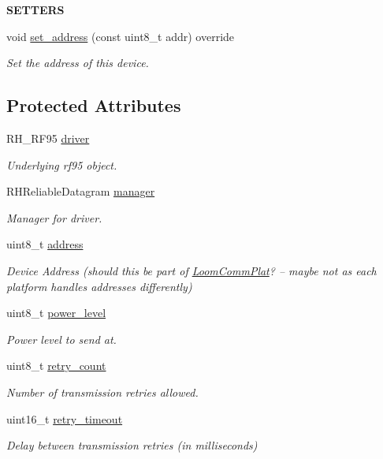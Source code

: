 \begin{Indent}{\bf S\+E\+T\+T\+E\+RS}\par
\begin{DoxyCompactItemize}
\item 
void \hyperlink{class_loom___lo_ra_abeb44544dc17bbc4d762ac53015c0e94}{set\+\_\+address} (const uint8\+\_\+t addr) override
\begin{DoxyCompactList}\small\item\em Set the address of this device. \end{DoxyCompactList}\end{DoxyCompactItemize}
\end{Indent}
\subsection*{Protected Attributes}
\begin{DoxyCompactItemize}
\item 
R\+H\+\_\+\+R\+F95 \hyperlink{class_loom___lo_ra_ab600601fa4ec84c05f34d448dd2787e6}{driver}
\begin{DoxyCompactList}\small\item\em Underlying rf95 object. \end{DoxyCompactList}\item 
R\+H\+Reliable\+Datagram \hyperlink{class_loom___lo_ra_a2d9e2b37554094a3ced44c213b433cd2}{manager}
\begin{DoxyCompactList}\small\item\em Manager for driver. \end{DoxyCompactList}\item 
uint8\+\_\+t \hyperlink{class_loom___lo_ra_a22a97e267e96a09325ab02ea0ae49f5b}{address}
\begin{DoxyCompactList}\small\item\em Device Address (should this be part of \hyperlink{class_loom_comm_plat}{Loom\+Comm\+Plat}? – maybe not as each platform handles addresses differently) \end{DoxyCompactList}\item 
uint8\+\_\+t \hyperlink{class_loom___lo_ra_ab512503f36bb6be6b3134cb66e4cc84c}{power\+\_\+level}
\begin{DoxyCompactList}\small\item\em Power level to send at. \end{DoxyCompactList}\item 
uint8\+\_\+t \hyperlink{class_loom___lo_ra_a477a700fccb38f5ac120bdfeb4ed4e4d}{retry\+\_\+count}
\begin{DoxyCompactList}\small\item\em Number of transmission retries allowed. \end{DoxyCompactList}\item 
uint16\+\_\+t \hyperlink{class_loom___lo_ra_ad3f2a482ed0ec0c7ecc3ca2e64b47ef9}{retry\+\_\+timeout}
\begin{DoxyCompactList}\small\item\em Delay between transmission retries (in milliseconds) \end{DoxyCompactList}\end{DoxyCompactItemize}
